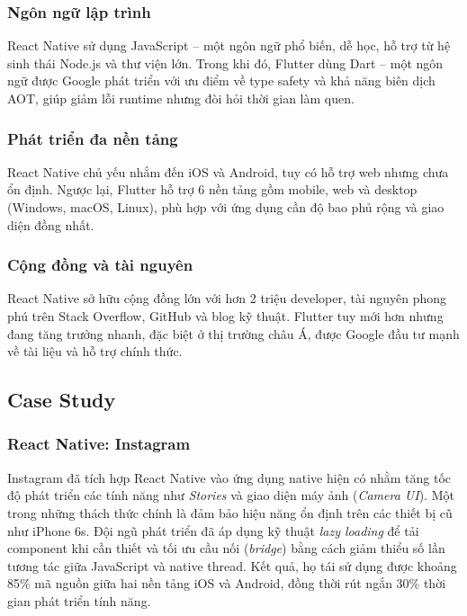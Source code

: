 \subsubsection{Ngôn ngữ lập trình}
\begin{flushleft}
  \hspace*{0.8cm}React Native sử dụng JavaScript – một ngôn ngữ phổ biến, dễ học, hỗ trợ từ hệ sinh thái Node.js và thư viện lớn. Trong khi đó, Flutter dùng Dart – một ngôn ngữ được Google phát triển với ưu điểm về type safety và khả năng biên dịch AOT, giúp giảm lỗi runtime nhưng đòi hỏi thời gian làm quen.
\end{flushleft}

\subsubsection{Phát triển đa nền tảng}
\begin{flushleft}
  \hspace*{0.8cm}React Native chủ yếu nhắm đến iOS và Android, tuy có hỗ trợ web nhưng chưa ổn định. Ngược lại, Flutter hỗ trợ 6 nền tảng gồm mobile, web và desktop (Windows, macOS, Linux), phù hợp với ứng dụng cần độ bao phủ rộng và giao diện đồng nhất.
\end{flushleft}

\subsubsection{Cộng đồng và tài nguyên}
\begin{flushleft}
  \hspace*{0.8cm}React Native sở hữu cộng đồng lớn với hơn 2 triệu developer, tài nguyên phong phú trên Stack Overflow, GitHub và blog kỹ thuật. Flutter tuy mới hơn nhưng đang tăng trưởng nhanh, đặc biệt ở thị trường châu Á, được Google đầu tư mạnh về tài liệu và hỗ trợ chính thức.
\end{flushleft}

\subsection{Case Study}
\renewcommand{\labelitemi}{--}    
\subsubsection{React Native: Instagram}
\begin{flushleft}
  \hspace*{0.8cm}Instagram đã tích hợp React Native vào ứng dụng native hiện có nhằm tăng tốc độ phát triển các tính năng như \textit{Stories} và giao diện máy ảnh (\textit{Camera UI}). Một trong những thách thức chính là đảm bảo hiệu năng ổn định trên các thiết bị cũ như iPhone 6s. Đội ngũ phát triển đã áp dụng kỹ thuật \textit{lazy loading} để tải component khi cần thiết và tối ưu cầu nối (\textit{bridge}) bằng cách giảm thiểu số lần tương tác giữa JavaScript và native thread. Kết quả, họ tái sử dụng được khoảng 85\% mã nguồn giữa hai nền tảng iOS và Android, đồng thời rút ngắn 30\% thời gian phát triển tính năng.
\end{flushleft}

